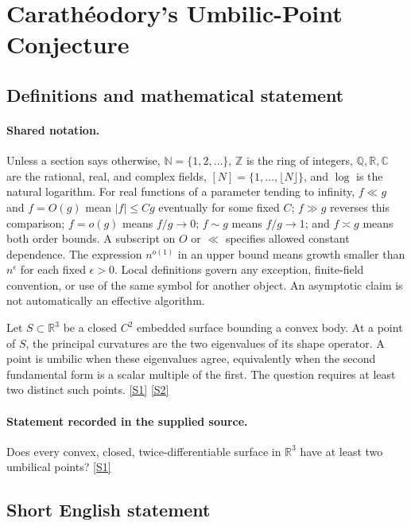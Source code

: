 \documentclass[11pt,a4paper]{article}
\newcommand{\N}{\mathbb{N}}
\newcommand{\Z}{\mathbb{Z}}
\newcommand{\Q}{\mathbb{Q}}
\newcommand{\R}{\mathbb{R}}
\newcommand{\C}{\mathbb{C}}
\newcommand{\sref}[2]{\hyperlink{source:#1:#2}{[S#2]}}
\begin{document}
\section{Carathéodory's Umbilic-Point Conjecture}\label{statement}


\subsection{Definitions and mathematical statement}

\paragraph{Shared notation.}Unless a section says otherwise, $\N=\{1,2,\ldots\}$,
$\Z$ is the ring of integers, $\Q,\R,\C$ are the rational, real, and complex
fields, $[N]=\{1,\ldots,\lfloor N\rfloor\}$, and $\log$ is the natural
logarithm. For real functions of a parameter tending to infinity,
$f\ll g$ and $f=O(g)$ mean $|f|\leq Cg$ eventually for some fixed $C$;
$f\gg g$ reverses this comparison; $f=o(g)$ means $f/g\to0$;
$f\sim g$ means $f/g\to1$; and $f\asymp g$ means both order bounds.
A subscript on $O$ or $\ll$ specifies allowed constant dependence.
The expression $n^{o(1)}$ in an upper bound means growth smaller than
$n^\epsilon$ for each fixed $\epsilon>0$. Local definitions govern any
exception, finite-field convention, or use of the same symbol for another
object. An asymptotic claim is not automatically an effective algorithm.



Let $S\subset\R^3$ be a closed $C^2$ embedded surface bounding a convex body. At a point of $S$, the principal curvatures are the two eigenvalues of its shape operator. A point is umbilic when these eigenvalues agree, equivalently when the second fundamental form is a scalar multiple of the first. The question requires at least two distinct such points. \sref{statement}{1} \sref{statement}{2}

\paragraph{Statement recorded in the supplied source.}
Does every convex, closed, twice-differentiable surface in $\mathbb{R}^3$ have at least two umbilical points? \sref{statement}{1}

\subsection{Short English statement}
\end{document}

